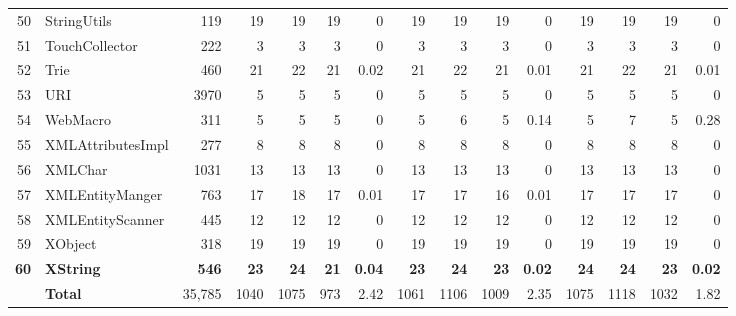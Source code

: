 \documentclass[conference]{IEEEtran}
\begin{document}
\begin{table} [htp!]
{\begin{tabularx}{0.91 \textwidth}{|r|l|r|r|r|r|r|r|r|r|r|r|r|r|r|}
50						& StringUtils				&119		& 19 		&	19	&	19	& 	0					& 19		& 19 		& 19		& 		0			& 19			& 19			& 19			&	0\\      
51						& TouchCollector			&222		& 3		&	3	&	3	& 	0					& 3		&  3		& 3		& 		0			& 3			& 3			& 3			&	0\\      
52						& Trie					&460		& 21		&	22	&	21	& 	0.02					& 21		&  22		& 21		& 		0.01			& 21			& 22			& 21			&	0.01\\      
53						& URI					&3970		& 5 		&	5	&	5	& 	0					& 5		&  5		& 5		& 		0			& 5			& 5			& 5			&	0\\      
54						& WebMacro				&311		& 5		&	5	&	5	& 	0					& 5		&  6		& 5		& 		0.14			& 5			& 7			& 5			&	0.28\\      
55						& XMLAttributesImpl			&277		& 8		&	8	&	8	& 	0					& 8		&  8		& 8		& 		0			& 8			& 8			& 8			&	0\\      
56						& XMLChar				&1031		& 13		&	13	&	13	& 	0					& 13		&  13		& 13		& 		0			& 13			& 13			& 13			&	0\\      
57						& XMLEntityManger			&763		& 17		&	18	&	17	& 	0.01					& 17		&  17		& 16		& 		0.01			& 17			& 17			& 17			&	0\\      
58						& XMLEntityScanner			&445		& 12		&	12	&	12	& 	0					& 12		&  12		& 12		& 		0			& 12			& 12			& 12			&	0\\      
59						& XObject					&318		& 19		&	19	&	19	& 	0					& 19		&  19		& 19		& 		0			& 19			& 19			& 19			&	0\\      
\textbf{60}						& \textbf{XString}					&\textbf{546}		& \textbf{23}		&	\textbf{24}	&	\textbf{21}	& 	\textbf{0.04}					& \textbf{23}		&  \textbf{24}		& \textbf{23}		& 		\textbf{0.02}			& \textbf{24}			& \textbf{24}			& \textbf{23}			&	\textbf{0.02}\\      
\hline 
    				&{\textbf{Total}}	&35,785	&1040	&	1075	&    973	&	2.42				& 1061	&1106	&1009	&		2.35		& 1075		& 1118		& 1032		& 	1.82\\
   \hline
     \end{tabularx} }
    \bigskip
    \label{table:Results}
\end{table}
\end{document}
